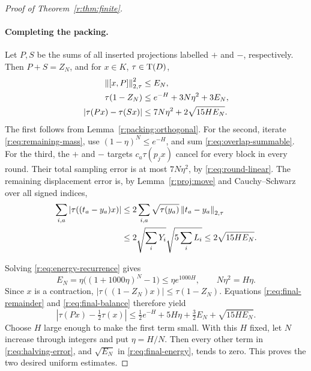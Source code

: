 \begin{proof}[Proof of Theorem~\ref{r:thm:finite}]
\paragraph{Completing the packing.}
Let \(P,S\) be the sums of all inserted projections labelled \(+\) and
\(-\), respectively. Then \(P+S=Z_N\), and for
\(x\in K\), \(\tau\in\operatorname T(D)\),
\begin{align}
 \left\|[x,P]\right\|_{2,\tau}^2&\leq E_N,\label{r:eq:final-energy}\\
 \tau(1-Z_N)&\leq e^{-H}+3N\eta^2+3E_N,
       \label{r:eq:final-remainder}\\
 |\tau(Px)-\tau(Sx)|
 &\leq7N\eta^2+2\sqrt{15HE_N}.
       \label{r:eq:final-balance}
\end{align}
The first follows from Lemma~\ref{r:packing:orthogonal}.
For the second, iterate \eqref{r:eq:remaining-mass}, use
\((1-\eta)^N\leq e^{-H}\), and sum
\eqref{r:eq:overlap-summable}.
For the third, the \(+\) and \(-\) targets \(c_a\tau(p_jx)\) cancel
for every block in every round. Their total sampling error is at most
\(7N\eta^2\), by \eqref{r:eq:round-linear}.
The remaining displacement error is, by Lemma~\ref{r:proj:move} and
Cauchy--Schwarz over all signed indices,
\begin{align*}
 \sum_{i,a}|\tau((t_a-y_a)x)|
 &\leq2\sum_{i,a}\sqrt{\tau(y_a)}
                          \left\|t_a-y_a\right\|_{2,\tau}\\
 &\leq2\sqrt{\sum_iY_i}\sqrt{5\sum_iL_i}
 \leq2\sqrt{15HE_N}.
\end{align*}

Solving \eqref{r:eq:energy-recurrence} gives
\[
 E_N=\eta\big((1+1000\eta)^N-1\big)\leq\eta e^{1000H},
 \qquad N\eta^2=H\eta.
\]
Since \(x\) is a contraction,
\(|\tau((1-Z_N)x)|\leq\tau(1-Z_N)\).
Equations \eqref{r:eq:final-remainder} and \eqref{r:eq:final-balance}
therefore yield
\begin{equation}\label{r:eq:halving-error}
 \left|\tau(Px)-\tfrac12\tau(x)\right|
 \leq\tfrac12e^{-H}+5H\eta+\tfrac32E_N+\sqrt{15HE_N}.
\end{equation}
Choose \(H\) large enough to make the first term small. With this \(H\)
fixed, let \(N\) increase through integers and put \(\eta=H/N\).
Then every other term in \eqref{r:eq:halving-error}, and
\(\sqrt{E_N}\) in \eqref{r:eq:final-energy}, tends to zero.
This proves the two desired uniform estimates.
\end{proof}
